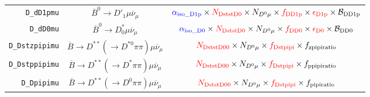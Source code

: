 \begin{landscape}
\begin{table}
\begin{tabular}{r|c|c}
       \texttt{D\_dD1pmu} &               $\overline{B}^0 \rightarrow D'_1 \mu \overline{\nu}_\mu$               &                                                                            $\textcolor{blue}{\alpha_\text{iso\_D1p}} \times \textcolor{red}{N_\text{DststD0}} \times N_{D^0 \mu} \times \textcolor{red}{f_\text{DD1p}} \times \textcolor{red}{\epsilon_\text{D1p}} \times \mathcal{B}_\text{DD1p}$                                                                            \\
        \texttt{D\_dD0mu} &              $\overline{B}^0 \rightarrow D^*_0 \mu \overline{\nu}_\mu$               &                                                                              $\textcolor{blue}{\alpha_\text{iso\_D0}} \times \textcolor{red}{N_\text{DststD0}} \times N_{D^0 \mu} \times \textcolor{red}{f_\text{DD0}} \times \textcolor{red}{\epsilon_\text{D0}} \times \mathcal{B}_\text{DD0}$                                                                              \\
   \texttt{D\_Dstzpipimu} & $\overline{B} \rightarrow D^{**} (\rightarrow D^{*0} \pi\pi) \mu \overline{\nu}_\mu$ &                                                                                                                          $\textcolor{red}{N_\text{DststD00}} \times N_{D^0 \mu} \times \textcolor{red}{f_\text{Dstpipi}} \times f_\text{zpipiratio}$                                                                                                                          \\
   \texttt{D\_Dstppipimu} &  $\overline{B} \rightarrow D^{**} (\rightarrow D^* \pi\pi) \mu \overline{\nu}_\mu$   &                                                                                                                          $\textcolor{red}{N_\text{DststD00}} \times N_{D^0 \mu} \times \textcolor{red}{f_\text{Dstpipi}} \times f_\text{ppipiratio}$                                                                                                                          \\
      \texttt{D\_Dpipimu} &  $\overline{B} \rightarrow D^{**} (\rightarrow D^0 \pi\pi) \mu \overline{\nu}_\mu$   &                                                                                                                          $\textcolor{red}{N_\text{DststD00}} \times N_{D^0 \mu} \times \textcolor{red}{f_\text{Dstpipi}} \times f_\text{pipiratio}$                                                                                                                           \\

\end{tabular}
\end{table}
\end{landscape}
